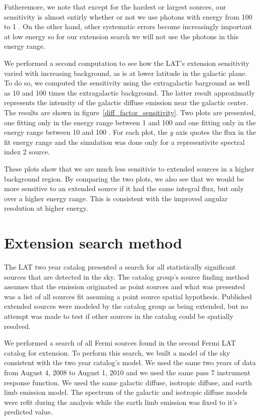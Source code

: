 \documentclass[12pt,preprint]{aastex}
\newcommand{\mev}{\text{MeV}\xspace}
\newcommand{\gev}{\text{GeV}\xspace}
\begin{document}
Futheremore, we note that except for the hardest or largest sources,
our sensitivity is almost entirly whether or not we use photons 
with energy from
100 \mev to 1 \gev. On the other hand, other systematic errors become
increasingly important at low energy so for our extension search we will
not use the photons in this energy range.

We performed a second computation to see how the LAT's extension
sensitivity varied with increasing background, as is at lower latitude
in the galactic plane. To do so, we computed the sensitivity using the
extragalactic barground as well as 10 and 100 times the extragalactic
background. The latter result approximatly represents the intensity of
the galactic diffuse emission near the galactic center. The results are
shown in figure~\ref{diff_factor_sensitivity}. Two plots are presented,
one fitting only in the energy range between 1 \gev and 100 \gev and
one fitting only in the energy range between 10 \gev and 100 \gev. For
each plot, the $y$ axis quotes the flux in the fit energy range and the
simulation was done only for a representivite spectral index 2 source.

These plots show that we are much less sensitivie to extended sources in
a higher background region. By comparing the two plots, we also see that
we would be more sensitive to an extended source if it had the same
integral flux, but only over a higher energy range. This is 
consistent with the improved angular resolution at higher energy.

\section{Extension search method}

The LAT two year catalog presented a search for all
statistically significant sources that are detected in the \gev
sky\cite{second_cat}.  The catalog group's source finding method assumes
that the emission originated as point sources and what was presented was
a list of all sources fit assuming a point source spatial hypothesis. 
Published extended sources were modeled by the catalog group as 
being extended, but no attempt was made to test if other sources in the catalog
could be spatially resolved.

We performed a search of all Fermi sources found in the second Fermi LAT
catalog for extension.  To perform this search, we built a model of the
sky consistent with the two year catalog's model.   We used the same two
years of data from August 4, 2008 to August 1, 2010 and we used the same
pass 7 instrument response function.  We used the same galactic diffuse,
isotropic diffuse, and earth limb emission model. The spectrum of the
galactic and isotropic diffuse models were refit during the analysis
while the earth limb emission was fixed to it's predicted value.
\end{document}

